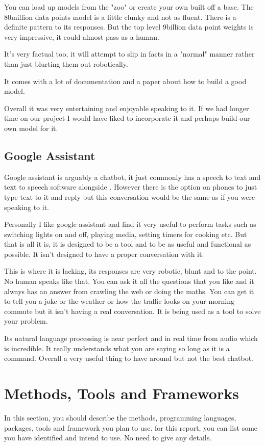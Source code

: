 \documentclass[11pt]{article}
\begin{document}
	You can load up models from the "zoo" or create your own built off a base. The 80million data points model is a little clunky and not as fluent. There is a definite pattern to its responses. But the top level 9billion data point weights is very impressive, it could almost pass as a human. 
	
	It's very factual too, it will attempt to slip in facts in a "normal" manner rather than just blurting them out robotically. 
	
	It comes with a lot of documentation and a paper about how to build a good model. 
	
	Overall it was very entertaining and enjoyable speaking to it. If we had longer time on our project I would have liked to incorporate it and perhaps build our own model for it. 
	
	\subsection{Google Assistant}
	Google assistant is arguably a chatbot, it just commonly has a speech to text and text to speech software alongside \citet{Google Assistant}. However there is the option on phones to just type text to it and reply but this conversation would be the same as if you were speaking to it.
	
	Personally I like google assistant and find it very useful to perform tasks such as switching lights on and off, playing media, setting timers for cooking etc. But that is all it is, it is designed to be a tool and to be as useful and functional as possible. It isn't designed to have a proper conversation with it. 
	
	This is where it is lacking, its responses are very robotic, blunt and to the point. No human speaks like that. You can ask it all the questions that you like and it always has an answer from crawling the web or doing the maths. You can get it to tell you a joke or the weather or how the traffic looks on your morning commute but it isn't having a real conversation. It is being used as a tool to solve your problem.
	
	Its natural language processing is near perfect and in real time from audio which is incredible. It really understands what you are saying so long as it is a command. Overall a very useful thing to have around but not the best chatbot.	
	
	\section{Methods, Tools and Frameworks}
	In this section, you should describe the methods, programming languages, packages, tools and framework you plan to use.
	for this report, you can list some you have identified and intend to use.
	No need to give any details.     
	
\end{document}
